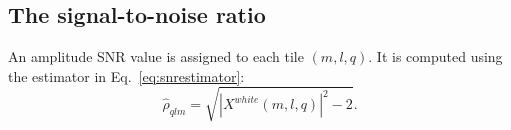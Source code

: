 \subsection{The signal-to-noise ratio} \label{sec:algorithm:snr}

An amplitude SNR value is assigned to each tile $(m,l,q)$. It is computed using the estimator in Eq.~\ref{eq:snrestimator}:
\begin{equation}
  \hat{\rho}_{qlm} = \sqrt{ |X^{white}(m,l,q)|^2-2}.
\end{equation}

